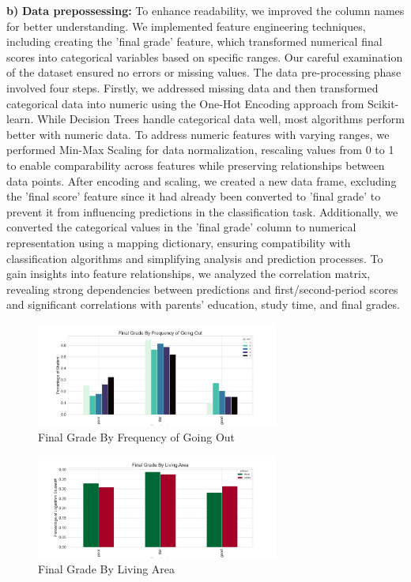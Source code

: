 \documentclass[conference]{IEEEtran}
\begin{document}
\textbf{b)} \textbf{Data prepossessing:} To enhance readability, we improved the column names for better understanding. We implemented feature engineering techniques, including creating the 'final grade' feature, which transformed numerical final scores into categorical variables based on specific ranges. Our careful examination of the dataset ensured no errors or missing values. The data pre-processing phase involved four steps. Firstly, we addressed missing data and then transformed categorical data into numeric using the One-Hot Encoding approach from Scikit-learn. While Decision Trees handle categorical data well, most algorithms perform better with numeric data. To address numeric features with varying ranges, we performed Min-Max Scaling for data normalization, rescaling values from 0 to 1 to enable comparability across features while preserving relationships between data points. After encoding and scaling, we created a new data frame, excluding the 'final score' feature since it had already been converted to 'final grade' to prevent it from influencing predictions in the classification task. Additionally, we converted the categorical values in the 'final grade' column to numerical representation using a mapping dictionary, ensuring compatibility with classification algorithms and simplifying analysis and prediction processes. To gain insights into feature relationships, we analyzed the correlation matrix, revealing strong dependencies between predictions and first/second-period scores and significant correlations with parents' education, study time, and final grades.
 
\begin{figure}[H]
    \centering
    \includegraphics[width=8cm]{fig2.png}
    \caption{Final Grade By Frequency of Going Out}
    \label{fig:2}
\end{figure}

\begin{figure}[H]
    \centering
    \includegraphics[width=8cm]{fig3.png}
    \caption{Final Grade By Living Area }
    \label{fig:3}
\end{figure}
\end{document}
